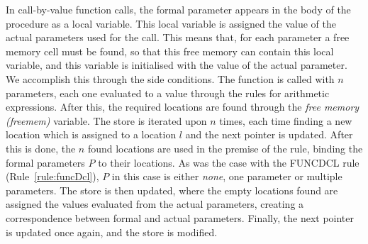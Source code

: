 \noindent
In call-by-value function calls, the formal parameter appears in the body of the procedure as a local variable. 
This local variable is assigned the value of the actual parameters used for the call. This means that, for each parameter a free memory cell must be found, so that this free memory can contain this local variable, and this variable is initialised with the value of the actual parameter. 
We accomplish this through the side conditions. 
The function is called with $n$ parameters, each one evaluated to a value through the rules for arithmetic expressions. 
After this, the required locations are found through the \textit{free memory (freemem)} variable. 
The store is iterated upon $n$ times, each time finding a new location which is assigned to a location $l$ and the next pointer is updated. 
After this is done, the $n$ found locations are used in the premise of the rule, binding the formal parameters $P$ to their locations. 
As was the case with the FUNCDCL rule (Rule~\ref{rule:funcDcl}), $P$ in this case is either \textit{none}, one parameter or multiple parameters. 
The store is then updated, where the empty locations found are assigned the values evaluated from the actual parameters, creating a correspondence between formal and actual parameters. 
Finally, the next pointer is updated once again, and the store is modified.
\\
